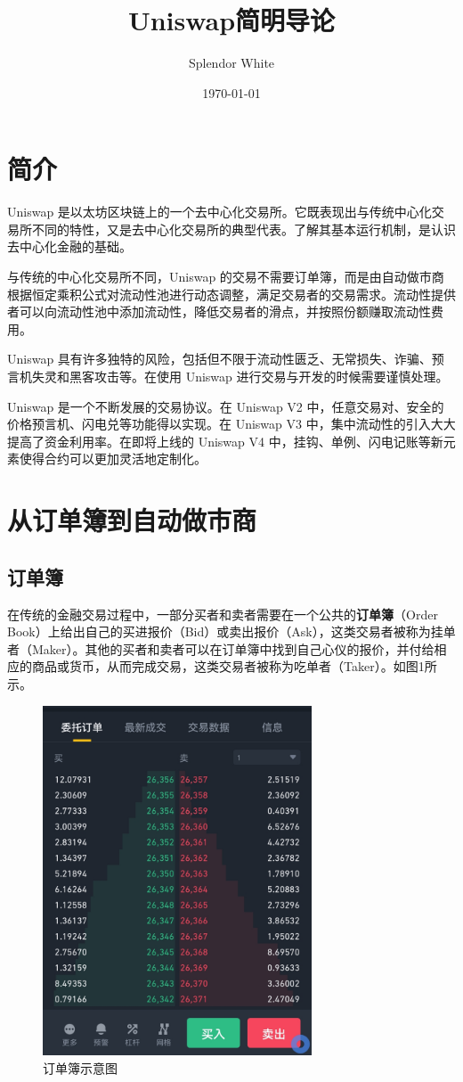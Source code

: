 \documentclass[12pt, a4paper, oneside]{ctexart}
\title{Uniswap简明导论}
\author{Splendor White}
\date{\today}
\begin{document}
\maketitle

\section{简介}

Uniswap 是以太坊区块链上的一个去中心化交易所。它既表现出与传统中心化交易所不同的特性，又是去中心化交易所的典型代表。了解其基本运行机制，是认识去中心化金融的基础。

与传统的中心化交易所不同，Uniswap 的交易不需要订单簿，而是由自动做市商根据恒定乘积公式对流动性池进行动态调整，满足交易者的交易需求。流动性提供者可以向流动性池中添加流动性，降低交易者的滑点，并按照份额赚取流动性费用。

Uniswap 具有许多独特的风险，包括但不限于流动性匮乏、无常损失、诈骗、预言机失灵和黑客攻击等。在使用 Uniswap 进行交易与开发的时候需要谨慎处理。

Uniswap 是一个不断发展的交易协议。在 Uniswap V2 中，任意交易对、安全的价格预言机、闪电兑等功能得以实现。在 Uniswap V3 中，集中流动性的引入大大提高了资金利用率。在即将上线的 Uniswap V4 中，挂钩、单例、闪电记账等新元素使得合约可以更加灵活地定制化。

\section{从订单簿到自动做市商}

\subsection{订单簿}

在传统的金融交易过程中，一部分买者和卖者需要在一个公共的\textbf{订单簿}（Order Book）上给出自己的买进报价（Bid）或卖出报价（Ask），这类交易者被称为挂单者（Maker）。其他的买者和卖者可以在订单簿中找到自己心仪的报价，并付给相应的商品或货币，从而完成交易，这类交易者被称为吃单者（Taker）。如图1所示。

\begin{figure}[htbp]
    \centering
    \includegraphics[width=8cm]{订单簿示意图.jpg}
    \caption{订单簿示意图}
\end{figure}
\end{document}

